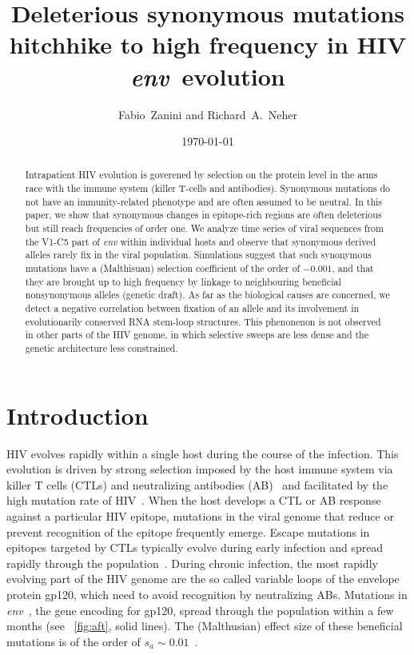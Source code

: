 \documentclass[rmp, twocolumn]{revtex4}
\newcommand{\Author}{Fabio~Zanini and Richard~A.~Neher}
\newcommand{\Title}{Deleterious synonymous mutations hitchhike to high frequency in HIV \env~evolution}
\newcommand{\env}{\textit{env}}
\begin{document}
\title{\Title}
\author{\Author}
\date{\today}

\begin{abstract}
\noindent
Intrapatient HIV evolution is goverened by selection on the protein level in the
arms race with the immune system (killer T-cells and antibodies). Synonymous
mutations do not have an immunity-related phenotype and are often assumed to be
neutral. In this paper, we show that synonymous changes in epitope-rich regions
are often deleterious but still reach frequencies of order one.  We analyze time
series of viral sequences from the V1-C5 part of {\it env} within individual
hosts and observe that synonymous derived alleles rarely fix in the
viral population. Simulations suggest that such synonymous mutations
have a (Malthisuan) selection coefficient of the order of $-0.001$, and that
they are brought up to high frequency by linkage to neighbouring beneficial
nonsynonymous alleles (genetic draft). As far as the biological causes are
concerned, we detect a negative correlation between fixation of an allele and
its involvement in evolutionarily conserved RNA stem-loop structures.
This phenonenon is not observed in other parts of the HIV genome, in which
selective sweeps are less dense and the genetic architecture less constrained.
\end{abstract}


\maketitle

\section{Introduction}
HIV evolves rapidly within a single host during the course of the infection.
This evolution is driven by strong selection imposed by the host immune system
via killer T cells (CTLs) and neutralizing antibodies
(AB)~\citep{pantaleo_immunopathogenesis_1996} and facilitated by the high
mutation rate of HIV~\citep{mansky_lower_1995}. When the host develops a CTL or
AB response against a particular HIV epitope, mutations in the viral genome that reduce or prevent
recognition of the epitope frequently emerge. Escape mutations in epitopes
targeted by CTLs typically evolve during early infection and spread rapidly through
the population~\citep{mcmichael_immune_2009}. During chronic infection, the most
rapidly evolving part of the HIV genome are the so called variable loops of the
envelope protein gp120, which need to avoid recognition by neutralizing ABs.
Mutations in \env~, the gene encoding for gp120, spread through the population
within a few months (see \figurename~\ref{fig:aft}, solid lines).
The (Malthusian) effect size of these beneficial mutations is of the
order of $s_a \sim 0.01$~\citep{neher_recombination_2010}.
\end{document}
